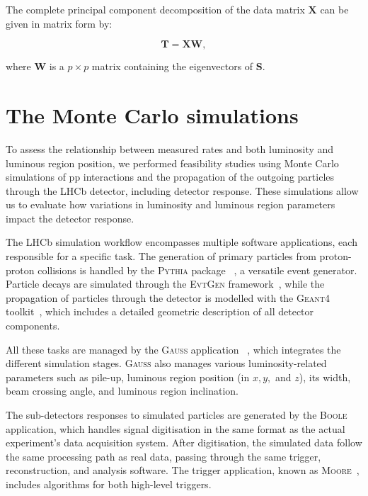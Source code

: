 The complete principal component decomposition of the data matrix $\mathbf{X}$ can be given in matrix form by:

\begin{equation}
\mathbf{T} = \mathbf{X} \mathbf{W},
\end{equation}

where $\mathbf{W}$ is a $p \times p$ matrix containing the eigenvectors of $\mathbf{S}$.



\section{The Monte Carlo simulations}\label{sec:MC}
To assess the relationship between measured rates and both luminosity and luminous region position, we performed feasibility studies using Monte Carlo simulations of pp interactions and the propagation of the outgoing particles through the LHCb detector, including detector response. These simulations allow us to evaluate how variations in luminosity and luminous region parameters impact the detector response.

The LHCb simulation workflow encompasses multiple software applications, each responsible for a specific task. The generation of primary particles from proton-proton collisions is handled by the \textsc{Pythia} package ~\cite{Sj_strand_2006}, a versatile event generator. Particle decays are simulated through the \textsc{EvtGen} framework~\cite{Lange:2001uf}, while the propagation of particles through the detector is modelled with the \textsc{Geant4} toolkit~\cite{Agostinelli:2002hh}, which includes a detailed geometric description of all detector components.

All these tasks are managed by the \textsc{Gauss} application ~\cite{Miglioranzi:1322402}, which integrates the different simulation stages. \textsc{Gauss} also manages various luminosity-related parameters such as pile-up, luminous region position (in \(x, y,\) and \(z\)), its width, beam crossing angle, and luminous region inclination.

The sub-detectors responses to simulated particles are generated by the \textsc{Boole}~\cite{1462666} application, which handles signal digitisation in the same format as the actual experiment's data acquisition system. After digitisation, the simulated data follow the same processing path as real data, passing through the same trigger, reconstruction, and analysis software. The trigger application, known as \textsc{Moore}~\cite{moore}, includes algorithms for both high-level triggers. 

